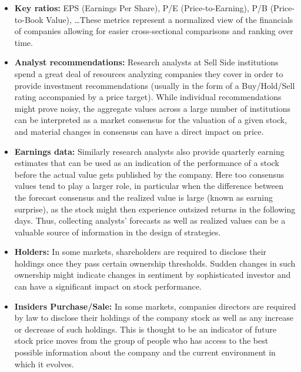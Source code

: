\begin{itemize}
\item \textbf{Key ratios:} EPS (Earnings Per Share), P/E (Price-to-Earning), P/B (Price-to-Book Value), \dots These metrics represent a normalized view of the financials of companies allowing for easier cross-sectional comparisons and ranking over time.

\item \textbf{Analyst recommendations:} Research analysts at Sell Side institutions spend a great deal of resources analyzing companies they cover in order to provide investment recommendations (usually in the form of a Buy/Hold/Sell rating accompanied by a price target). While individual recommendations might prove noisy, the aggregate values across a large number of institutions can be interpreted as a market consensus for the valuation of a given stock, and material changes in consensus can have a direct impact on price.

\item \textbf{Earnings data:} Similarly research analysts also provide quarterly earning estimates that can be used as an indication of the performance of a stock before the actual value gets published by the company. Here too consensus values tend to play a larger role, in particular when the difference between the forecast consensus and the realized value is large (known as earning surprise), as the stock might then experience outsized returns in the following days. Thus, collecting analysts' forecasts as well as realized values can be a valuable source of information in the design of strategies.

\item \textbf{Holders:}  In some markets, shareholders are required to disclose their holdings once they pass certain ownership thresholds. Sudden changes in such ownership might indicate changes in sentiment by sophisticated investor and can have a significant impact on stock performance.

\item \textbf{Insiders Purchase/Sale:}  In some markets, companies directors are required by law to disclose their holdings of the company stock as well as any increase or decrease of such holdings. This is thought to be an indicator of future stock price moves from the group of people who has access to the best possible information about the company and the current environment in which it evolves.


\end{itemize}
